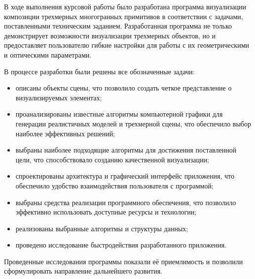 
В ходе выполнения курсовой работы было разработана программа визуализации композиции трехмерных многогранных примитивов в соответствии с задачами, поставленными техническим заданием. Разработанная программа не только демонстрирует возможности визуализации трехмерных объектов, но и предоставляет пользователю гибкие настройки для работы с их геометрическими и оптическими параметрами.

В процессе разработки были решены все обозначенные задачи:
\begin{itemize}[label=--]
	\item описаны объекты сцены, что позволило создать четкое представление о визуализируемых элементах;
	\item проанализированы известные алгоритмы компьютерной графики для генерации реалистичных моделей и трехмерной сцены, что обеспечило выбор наиболее эффективных решений;
	\item выбраны наиболее подходящие алгоритмы для достижения поставленной цели, что способствовало созданию качественной визуализации;
	\item спроектированы архитектура и графический интерфейс приложения, что обеспечило удобство взаимодействия пользователя с программой;
	\item выбраны средства реализации программного обеспечения, что позволило эффективно использовать доступные ресурсы и технологии;
	\item реализованы выбранные алгоритмы и структуры данных;
	\item проведено исследование быстродействия разработанного приложения.
\end{itemize}

Проведенные исследования программы показали её приемлимость и позволили сформулировать направление дальнейшего развития.